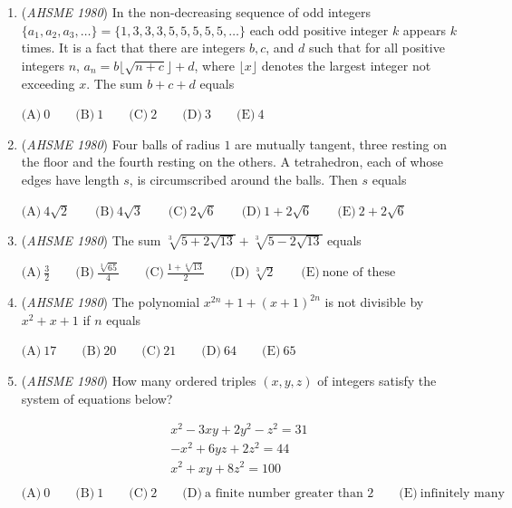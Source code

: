 \begin{enumerate}
	\item (\textit{AHSME 1980}) In the non-decreasing sequence of odd integers $\{a_1,a_2,a_3,\ldots \}=\{1,3,3,3,5,5,5,5,5,\ldots \}$ each odd positive integer $k$
appears $k$ times. It is a fact that there are integers $b, c$, and $d$ such that for all positive integers $n$, 
$a_n=b\lfloor \sqrt{n+c} \rfloor +d$, 
where $\lfloor x \rfloor$ denotes the largest integer not exceeding $x$. The sum $b+c+d$ equals 


 $\text{(A)} \ 0 \qquad  \text{(B)} \ 1 \qquad  \text{(C)} \ 2 \qquad  \text{(D)} \ 3 \qquad  \text{(E)} \ 4$


	\item (\textit{AHSME 1980}) Four balls of radius $1$ are mutually tangent, three resting on the floor and the fourth resting on the others. 
A tetrahedron, each of whose edges have length $s$, is circumscribed around the balls. Then $s$ equals 


 $\text{(A)} \ 4\sqrt 2 \qquad  \text{(B)} \ 4\sqrt 3 \qquad  \text{(C)} \ 2\sqrt 6 \qquad  \text{(D)}\ 1+2\sqrt 6\qquad \text{(E)}\ 2+2\sqrt 6$


	\item (\textit{AHSME 1980}) The sum $\sqrt[3] {5+2\sqrt{13}}+\sqrt[3]{5-2\sqrt{13}}$ equals 


 $\text{(A)} \ \frac 32 \qquad  \text{(B)} \ \frac{\sqrt[3]{65}}{4} \qquad  \text{(C)} \ \frac{1+\sqrt[6]{13}}{2} \qquad  \text{(D)}\ \sqrt[3]{2}\qquad \text{(E)}\ \text{none of these}$


	\item (\textit{AHSME 1980}) The polynomial $x^{2n}+1+(x+1)^{2n}$ is not divisible by $x^2+x+1$ if $n$ equals 


 $\text{(A)} \ 17 \qquad  \text{(B)} \ 20 \qquad  \text{(C)} \ 21 \qquad  \text{(D)} \ 64 \qquad  \text{(E)} \ 65$


	\item (\textit{AHSME 1980}) How many ordered triples $(x,y,z)$ of integers satisfy the system of equations below? 


 
 \[\begin{array}{l} x^2-3xy+2y^2-z^2=31 \\ -x^2+6yz+2z^2=44 \\ x^2+xy+8z^2=100\\ \end{array}\]
$\text{(A)} \ 0 \qquad  \text{(B)} \ 1 \qquad  \text{(C)} \ 2 \qquad  \text{(D)}\ \text{a finite number greater than 2}\qquad \text{(E)}\ \text{infinitely many}$



\end{enumerate}
